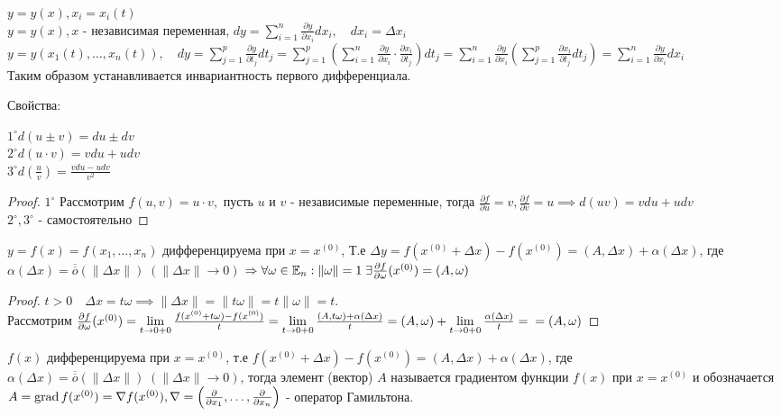 \documentclass[../main.tex]{subfiles}
\begin{document}
$y=y(x), x_{i}=x_{i}(t)$
\\$y= y(x),x$ - независимая переменная, $dy = \sum_{i   =1}^{n  } \frac{\partial{y}}{\partial{x_{i}}}dx_{i}, \quad dx_{i}=\Delta x_{i}$
\\$y=y(x_{1}(t),\dots,x_{n}(t)),\quad dy = \sum_{j=1}^{p    } \frac{\partial{y}}{\partial{t_{j}}}dt_{j}= \sum_{j=1}^{p  }\left(\sum_{i=1}^{n}\frac{\partial{y}}{\partial{x_{i}}}\cdot \frac{ \partial{x_{i}}}{\partial{t_{j}}} \right) dt_{j}=\sum_{i   =1}^{n}\frac{\partial{y}}{\partial{x_{i}}}\left(\sum_{j=1}^{p   } \frac{\partial{x_{i}}}{\partial{t_{j}}}dt_{j}\right) = \sum_{i    =1}^{n} \frac{\partial{y}}{\partial{x_{i}}}dx_{i}   $
\\Таким образом устанавливается инвариантность первого дифференциала.

Свойства:

\noindent$1^{\circ} d(u\pm v)=du\pm dv$\\ 
$2^{\circ} d(u\cdot v)=vdu+udv$\\ 
$3^{\circ} d\left(\frac{u}{v}\right)=  \frac{vdu-udv}{v^{2}}$

\begin{proof}
    $1^{\circ}$ Рассмотрим $f(u,v)=u\cdot v,$ пусть $u$ и $v$ - независимые переменные, тогда $\frac{\partial{f}}{\partial{u}}=v, \frac{\partial{f}}{\partial{v}}=u\implies d(uv)=vdu+udv$
    \\$2^{\circ},3^{\circ}$ - самостоятельно

\end{proof}
\begin{theorem}
    $y=f(x)=f(x_{1},\dots,x_{n})$ дифференцируема при $x=x^{(0)}$, Т.е $\Delta y = f(x^{(0)}+\Delta x)-f(x^{(0)})= (A,\Delta x) + \alpha(\Delta x)$, где $\alpha(\Delta x) = \overline{\overline{o}}(\|\Delta x\|)\; (\|\Delta x\| \to 0)$
    $\Rightarrow \forall \omega \in \mathbb{E}_{n}: \|\omega\| = 1 \; \exists \frac{\partial{f}}{\partial{\omega}}(x^{(0)}) = (A,\omega)$
\end{theorem}
\begin{proof}
    $t>0\quad \Delta x = t\omega\implies \|\Delta x\| = \|t \omega\| = t\|\omega\| = t$. 
    \\Рассмотрим $\frac{\partial{f}}{\partial{\omega}}(x^{(0)}) = \lim_{t\to 0+0} \frac{f(x^{(0)}+t\omega)-f(x^{(0)})}{t} = \lim_{t\to 0+0} \frac{(A,t\omega)+\alpha(\Delta x)}{t} =  (A,\omega)+ \lim\limits_{ t\to 0+0} \frac{\alpha(\Delta x)}{t} = \\ =(A,\omega)$ 
\end{proof}
\begin{definition}
    $f(x)$ дифференцируема при $x=x^{(0)}$, т.е $f(x^{(0)}+\Delta x)-f(x^{(0)}) = (A,\Delta x)+\alpha(\Delta x)$, где $\alpha(\Delta x) = \overline{\overline{o}}(\|\Delta x\|)\; (\|\Delta x\| \to 0)$, тогда элемент (вектор) $A$ называется градиентом функции $f(x)$ при $x=x^{(0)}$ и обозначается $A=\operatorname{grad}{f(x^{(0)})}=\nabla f(x^{(0)}), \nabla = \left( \frac{\partial}{\partial{x_{1}}}, \dots, \frac{\partial}{\partial{x_{n}}}\right)$ - оператор Гамильтона. 
\end{definition}
\end{document}
